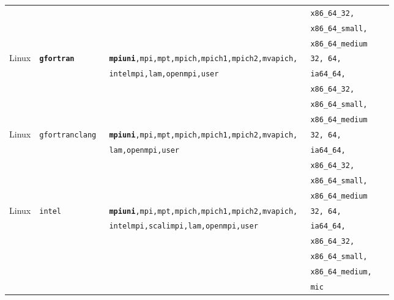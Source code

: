 \begin{longtable}{lllll}
        &                         &                              &\tt x86\_64\_32, \\
        &                         &                              &\tt x86\_64\_small, \\
        &                         &                              &\tt x86\_64\_medium \\
Linux   &\tt {\bf gfortran}       &\footnotesize \tt {\bf mpiuni},mpi,mpt,mpich,mpich1,mpich2,mvapich, &\tt 32, 64, \\
        &                         &\footnotesize \tt intelmpi,lam,openmpi,user                          &\tt ia64\_64, \\
        &                         &                              &\tt x86\_64\_32, \\
        &                         &                              &\tt x86\_64\_small, \\
        &                         &                              &\tt x86\_64\_medium \\
Linux   &\tt gfortranclang        &\footnotesize \tt {\bf mpiuni},mpi,mpt,mpich,mpich1,mpich2,mvapich, &\tt 32, 64, \\
        &                         &\footnotesize \tt lam,openmpi,user                                    &\tt ia64\_64, \\
        &                         &                              &\tt x86\_64\_32, \\
        &                         &                              &\tt x86\_64\_small, \\
        &                         &                              &\tt x86\_64\_medium \\
Linux   &\tt intel                &\footnotesize \tt {\bf mpiuni},mpi,mpt,mpich,mpich1,mpich2,mvapich, &\tt 32, 64, \\
        &                         &\footnotesize \tt intelmpi,scalimpi,lam,openmpi,user                 &\tt ia64\_64, \\
        &                         &                              &\tt x86\_64\_32, \\
        &                         &                              &\tt x86\_64\_small, \\
        &                         &                              &\tt x86\_64\_medium, \\
        &                         &                              &\tt mic \\

\end{longtable}
